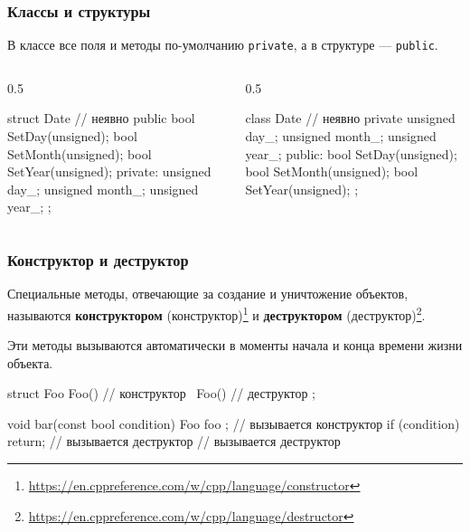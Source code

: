 \documentclass[compress, 8pt, aspectratio=169]{beamer}
\begin{document}
\begin{frame}[fragile]

    \frametitle{Классы и структуры}

    В классе все поля и методы по-умолчанию \verb|private|, а в структуре
    --- \verb|public|.

    \begin{columns}[T]

        \begin{column}{0.5\textwidth}

            \begin{myinplacelisting}[minted language=cpp]
struct Date {
    // неявно public
    bool SetDay(unsigned);
    bool SetMonth(unsigned);
    bool SetYear(unsigned);
private:
    unsigned day_;
    unsigned month_;
    unsigned year_;
};
            \end{myinplacelisting}

        \end{column}

        \begin{column}{0.5\textwidth}

            \begin{myinplacelisting}[minted language=cpp]
class Date {
    // неявно private
    unsigned day_;
    unsigned month_;
    unsigned year_;
public:
    bool SetDay(unsigned);
    bool SetMonth(unsigned);
    bool SetYear(unsigned);
};
            \end{myinplacelisting}

        \end{column}

    \end{columns}

\end{frame}

\begin{frame}[fragile]

    \frametitle{Конструктор и деструктор}

    Специальные методы, отвечающие за создание и уничтожение объектов, называются
    \textbf{конструктором} (конструктор)\footnote{\url{https://en.cppreference.com/w/cpp/language/constructor}}
    и \textbf{деструктором} (деструктор)\footnote{\url{https://en.cppreference.com/w/cpp/language/destructor}}.

    Эти методы вызываются автоматически в моменты начала и конца времени жизни объекта.

    \begin{myinplacelisting}[minted language=cpp]
struct Foo {
    Foo() {} // конструктор
    ~Foo() {} // деструктор
};

void bar(const bool condition) {
    Foo foo {}; // вызывается конструктор
    if (condition) {
        return; // вызывается деструктор
    }
} // вызывается деструктор
    \end{myinplacelisting}

\end{frame}
\end{document}
